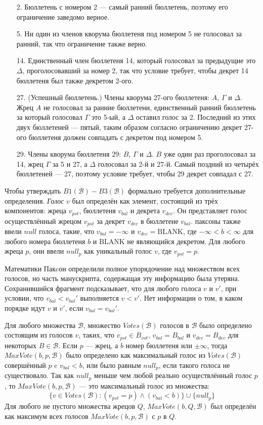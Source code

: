 \documentclass[12pt, a4paper]{article} %
\begin{document}
\begin{itemize}
    \item[2.] Бюллетень с номером 2 --- самый ранний бюллетень, поэтому его ограничение заведомо верное.
    \item[5.] Ни один из членов кворума бюллетеня под номером 5 не голосовал за ранний, так что ограничение также верно.
    \item[14.] Единственный член бюллетеня 14, который голосовал за предыдущие это $\Delta$, проголосовавший за номер 2, так что условие требует, чтобы декрет 14 бюллетеня был также декретом 2-ого.
    \item[27.] (Успешный бюллетень.) Члены кворума 27-ого бюллетеня: $A$, $\Gamma$ и $\Delta$. Жрец $A$ не голосовал за ранние бюллетени, единственный ранний бюллетень за который голосовал $\Gamma$ это 5-ый, а $\Delta$ оставил голос за 2. Последний из этих двух бюллетеней --- пятый, таким образом согласно ограничению декрет 27-ого бюллетеня должен совпадать с декретом под номером 5.
    \item[29.] Члены кворума бюллетеня 29: $B$, $\Gamma$ и $\Delta$. $B$ уже один раз проголосовал за 14, жрец $\Gamma$ за 5 и 27, а $\Delta$ голосовал за 2-й и 27-й. Самый поздний из четырёх бюллетеней --- 27, поэтому условие требует, чтобы 29 декрет совпадал с 27.
\end{itemize}


Чтобы утверждать $B1(\mathcal{B}) - B3(\mathcal{B})$ формально требуется дополнительные определения. \textit{Голос} $v$ был определён как элемент, состоящий из трёх компонентов: жреца $v_{pst}$, бюллетеня $v_{bal}$ и декрета $v_{dec}$. Он представляет голос осуществлённый жрецом $v_{pst}$ за декрет $v_{dec}$ в бюллетене $v_{bal}$. паксоны также ввели $null$ голоса, такие, что $v_{bal}=-\infty$ и $v_{dec}=\mathrm{BLANK}$, где $-\infty < b < \infty$ для любого номера бюллетеня $b$ и $\mathrm{BLANK}$ не являющийся декретом. Для любого жреца $p$, они ввели $null_p$ как уникальный голос $v$, где $v_{pst}=p$.

Математики Пакcон определили полное упорядочение над множеством всех голосов, но часть манускрипта, содержащая эту информацию была утеряна. Сохранившийся фрагмент подсказывает, что для любого голоса $v$ и $v'$, при условии, что $v_{bal} < v_{bal}'$ выполняется $v < v'$. Нет информации о том, в каком порядке идут $v$ и $v'$, если $v_{bal} = v_{bal}'$.

Для любого множества $\mathcal{B}$, множество $Votes(\mathcal{B})$ голосов в $\mathcal{B}$ было определено состоящим из голосов $v$, таких, что $v_{pst} \in B_{vot}$, $v_{bal} = B_{bal}$ и $v_{dec} = B_{dec}$ для некоторых $B \in \mathcal{B}$. Если $p$ --- жрец, а $b$ номер бюллетеня или $\pm \infty$, тогда $MaxVote(b, p, \mathcal{B})$ было определено как максимальный голос из $Votes(\mathcal{B})$ совершённый $p$ c $v_{bal} < b$, или было равным $null_p$, если такого голоса не существовало. Так как $null_p$ меньше чем любой реально осуществлённый голос $p$, то $MaxVote(b,p, \mathcal{B})$ --- это максимальный голос из множества:
\[  
    \{v \in Votes(\mathcal{B}) : (v_{pst} = p) \land (v_{bal} < b)\} \cup \{null_p\}
\]
Для любого не пустого множества жрецов $Q$, $MaxVote(b, Q, \mathcal{B})$ был определён как максимум всех голосов $MaxVote(b, p, \mathcal{B})$ с $p$ в $Q$.
\end{document}
